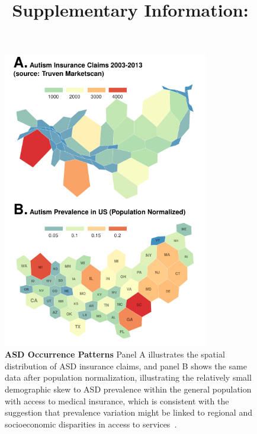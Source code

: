 \documentclass[onecolumn,,10pt]{IEEEtran}
\renewcommand{\captionN}[1]{\caption{\color{CadetBlue4!80!black} \sffamily \fontsize{9}{10}\selectfont #1  }}
\newif\ifFIGS
\begin{document}

\def\HCOL{\color{black}}
\title{{\Large\bf Supplementary Information:}\\\TITLE}
\maketitle

\tableofcontents
\listoftables

\clearpage



\clearpage
\ifFIGS
\begin{figure}[!ht]
  \centering
  \includegraphics[width=0.8\textwidth]{Figures/External/occurv}

  \captionN{\textbf{ASD Occurrence Patterns}  Panel A illustrates the spatial distribution of ASD insurance claims, and panel B shows the same data after population normalization, illustrating the relatively small demographic skew to ASD prevalence within the general population with access to medical insurance, which is consistent with the suggestion that prevalence variation might be linked to regional and socioeconomic disparities in access to services~\cite{jarquin2011racial}.}\label{figocc}
    \vspace{-5pt}

\end{figure}
\end{document}
